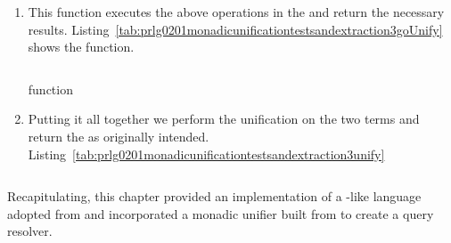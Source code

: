 \documentclass[thesis-solanki.tex]{subfiles}
\begin{document}
\begin{enumerate}
\item{}

This function executes the above operations in the  and return the necessary results.
Listing~\ref{tab:prlg0201monadicunificationtestsandextraction3goUnify} shows the  function.

\begin{code-list}[H]
  \begin{singlespace}
    \inputminted[linenos,firstline=95, lastline=107]{haskell}{haskell-proto2-monadic-unification-tests-and-extraction.hs}
  \end{singlespace}
\caption{ function}
\label{tab:prlg0201monadicunificationtestsandextraction3goUnify}
\end{code-list}

\item{}

Putting it all together we perform the unification on the two terms and return the  as originally intended.
Listing~\ref{tab:prlg0201monadicunificationtestsandextraction3unify}

\begin{code-list}[H]
  \begin{singlespace}
    \inputminted[linenos,firstline=121, lastline=131]{haskell}{haskell-proto2-monadic-unification-tests-and-extraction.hs}
  \end{singlespace}
\caption{}
\label{tab:prlg0201monadicunificationtestsandextraction3unify}
\end{code-list}


\end{enumerate}


Recapitulating, this chapter provided an implementation of a -like language adopted from
\cite{prolog-lib} and incorporated a monadic unifier built from \cite{unification-fd-lib} to create a
 query resolver.

\ifMain\ifDraft
\begin{scope}
  \nolinenumbers
  \enotesize
  \par
  \begin{singlespace}
  \setlength{\parskip}{12pt plus 2pt minus 1pt}
  \theendnotes
  \par
  \end{singlespace}
\end{scope}
\fi\fi
\end{document}
